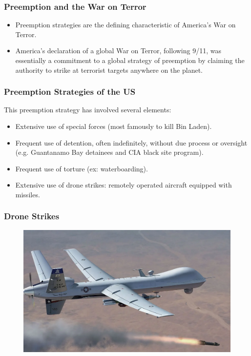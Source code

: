 \documentclass[handout]{beamer}
\begin{document}
\begin{frame} 
\frametitle{\LARGE{Preemption and the War on Terror}}
\begin{itemize}
	\item Preemption strategies are the defining characteristic of America's War on Terror. \pause
	\item America's declaration of a global War on Terror, following 9/11, was essentially a commitment to a global strategy of preemption by claiming the authority to strike at terrorist targets anywhere on the planet.	
\end{itemize}
\end{frame}

\begin{frame} 
	\frametitle{\LARGE{Preemption Strategies of the US}}
This preemption strategy has involved several elements:
	\begin{itemize}
		\item Extensive use of special forces (most famously to kill Bin Laden). \pause	
		\item Frequent use of detention, often indefinitely, without due process or oversight (e.g. Guantanamo Bay detainees and CIA black site program). \pause
		\item Frequent use of torture (ex: waterboarding). \pause
		\item Extensive use of drone strikes: remotely operated aircraft equipped with missiles.
	\end{itemize}
\end{frame}

\begin{frame} 
	\frametitle{\LARGE{Drone Strikes}}
	\begin{figure}[ht!]
		\centering
		\includegraphics[width=\textwidth,height=\textheight,keepaspectratio]{drone.png}
	\end{figure}
\end{frame}
\end{document}
